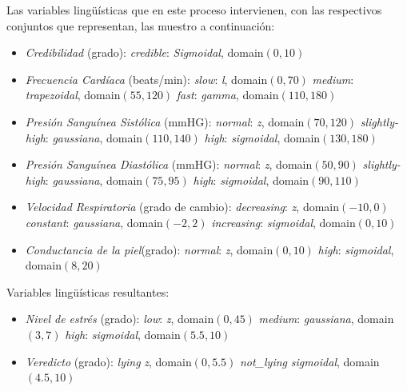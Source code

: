 \documentclass[a4paper,10pt,twocolumn]{article}
\begin{document}
  Las variables lingüísticas que en este proceso intervienen, con las respectivos conjuntos que representan, las muestro a continuaci\'on:
  \begin{itemize}
  	\item \textit{Credibilidad} (grado): 
  		\subitem  \textit{credible}:  \textit{Sigmoidal}, domain$(0,10)$
  	\item \textit{Frecuencia Card\'iaca} (beats/min):  
  		\subitem \textit{slow}: \textit{l}, domain$(0,70)$
  		\subitem \textit{medium}: \textit{trapezoidal}, domain$(55,120)$
  		\subitem \textit{fast}: \textit{gamma}, domain$(110,180)$
   	\item \textit{Presi\'on Sangu\'inea Sist\'olica} (mmHG): 
   		\subitem \textit{normal}: \textit{z}, domain$(70,120)$
   		\subitem \textit{slightly-high}: \textit{gaussiana}, domain$(110,140)$
   		\subitem \textit{high}: \textit{sigmoidal}, domain$(130,180)$
  	\item \textit{Presi\'on Sangu\'inea Diast\'olica} (mmHG): 
  	    \subitem \textit{normal}: \textit{z}, domain$(50,90)$
		\subitem \textit{slightly-high}: \textit{gaussiana}, domain$(75,95)$
		\subitem \textit{high}: \textit{sigmoidal}, domain$(90,110)$
  	\item \textit{Velocidad Respiratoria} (grado de cambio):  
  		\subitem \textit{decreasing}: \textit{z}, domain$(-10,0)$
  		\subitem \textit{constant}: \textit{gaussiana}, domain$(-2,2)$
  		\subitem \textit{increasing}: \textit{sigmoidal}, domain$(0,10)$
  	\item \textit{Conductancia de la piel}(grado): 
  		\subitem \textit{normal}: \textit{z}, domain$(0,10)$
  		\subitem \textit{high}:	\textit{sigmoidal}, domain$(8,20)$
  \end{itemize}
  Variables lingüísticas resultantes:
  \begin{itemize}
		\item \textit{Nivel de estr\'es} (grado):
			\subitem \textit{low}:	\textit{z}, domain$(0,45)$
			\subitem \textit{medium}:	\textit{gaussiana}, domain$(3,7)$
			\subitem \textit{high}:	\textit{sigmoidal}, domain$(5.5, 10)$
		\item \textit{Veredicto} (grado):
			\subitem \textit{lying} \textit{z}, domain$(0, 5.5)$
			\subitem \textit{not\_lying} \textit{sigmoidal}, domain$(4.5, 10)$
  \end{itemize}
  
\end{document}

